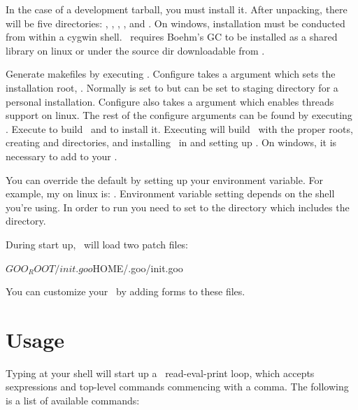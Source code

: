 \documentclass[twoside,twocolumn,9pt]{extarticle}
\begin{document}
In the case of a development tarball, you must install it.  After
unpacking, there will be five directories: , ,
, , and .  On windows, installation must
be conducted from within a cygwin shell.  \goo\ requires Boehm's GC to
be installed as a shared library on linux or under the source dir
 downloadable from
.

Generate makefiles by executing .  Configure takes a
 argument which sets the installation root,
.  Normally  is set to 
but can be set to staging directory for a personal installation.
Configure also takes a  argument which enables
threads support on linux.  The rest of the configure arguments can be
found by executing .  Execute  to
build \goo\ and  to install it.  Executing
 will build \goo\ with the proper roots, creating
 and  directories, and installing \goo\ in
 and setting up .  On windows, it is necessary to
add  to your .

You can override the default  by
setting up your  environment variable.  
For example, my  on linux is: 
.
Environment variable setting depends on the shell you're using.
In order to run  you need to
set  to the directory which includes the 
directory.  

During start up, \goo\ will load two patch files:

\begin{exv}
${GOO_ROOT}/init.goo
${HOME}/.goo/init.goo
\end{exv}

You can customize your \goo\ by adding forms to these files.

\section{Usage}

Typing  at your shell will start up a \goo\ read-eval-print
loop, which accepts sexpressions and top-level commands commencing
with a comma.  The following is a list of available commands:
\end{document}
